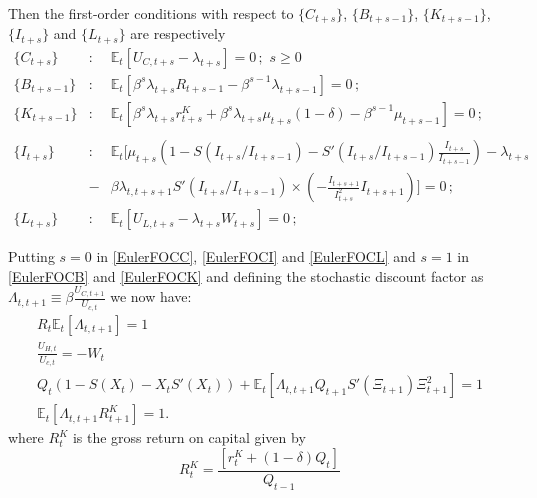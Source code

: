 \documentclass[thmsa,11pt,a4paper]{article}
\theoremstyle{definition}
\begin{document}
Then the first-order conditions with respect to  $\{C_{t+s}\}$, $\{B_{t+s-1}\}$,  $\{K_{t+s-1}\}$,  $\{I_{t+s}\}$ and $\{L_{t+s}\}$ are respectively
\begin{eqnarray}
\label{EulerFOCC} \{C_{t+s}\}&:&  \mathbb{E}_t[U_{C, t+s} - \lambda_{t+s}] =0\,;\,\, s \ge 0 \\
\label{EulerFOCB}\{B_{t+s-1}\}&:&  \mathbb{E}_t[\beta^s \lambda_{t+s} R_{t+s-1}- \beta^{s-1} \lambda_{t+s-1}]=0 \,;\,\, \\
\{K_{t+s-1}\}&:&\label{EulerFOCK}\mathbb{E}_t[\beta^s \lambda_{t+s} r_{t+s}^K + \beta^{s} \lambda_{t+s} \mu_{t+s}(1-\delta)-
\beta^{s-1}  \mu_{t+s-1}]=0 \,;\, \nonumber\\\\
\label{EulerFOCI}\{I_{t+s}\}&:&\mathbb{E}_{t}\big[\mu_{t+s}\left(1-S\left(I_{t+s}/I_{t+s-1}\right)-S'\left(I_{t+s}/I_{t+s-1}\right)\frac{I_{t+s}}{I_{t+s-1}}\right)
-\lambda_{t+s}
\nonumber \\&-&\beta \lambda_{t,t+s+1}S'\left(I_{t+s}/I_{t+s-1}\right)\times\left(-\frac{I_{t+s+1}}{I_{t+s}^{2}}I_{t+s+1}\right)\big]
=0 \,;\,\, \\
\{L_{t+s}\}&:&\mathbb{E}_t[U_{L, t+s} - \lambda_{t+s} W_{t+s} ]=0\,;\,\, \label{EulerFOCL}
\end{eqnarray}

Putting $s=0$ in   \eqref{EulerFOCC}, \eqref{EulerFOCI} and \eqref{EulerFOCL} and $s=1$ in  \eqref{EulerFOCB} and \eqref{EulerFOCK} and defining the stochastic discount factor as  $\Lambda_{t,t+1} \equiv \beta \frac{U_{C,t+1}}{U_{c,t}}$   we now have:
 \begin{align}
R_t \mathbb{E}_t\left[ \Lambda_{t,t+1} \right] =1 \label{RBCEulerApp}\\
\frac{U_{H,t}}{U_{c,t}}=-W_t\\
\label{IFOCApp}
Q_t (1-S(X_t)-X_t S'(X_t)) +\mathbb{E}_t \left[ \Lambda_{t,t+1} 
Q_{t+1} S'(\Xi_{t+1}) \Xi_{t+1}^2 \right] =1 \\
\mathbb{E}_t\left[ \Lambda_{t,t+1} R_{t+1}^K\right]= 1.  \label{RBCFOCKApp}
 \end{align}
where $R_{t}^K$ is the gross return on capital  given by
\begin{equation} \nonumber
 R_{t}^K= \frac{\left[r_{t}^K +(1-\delta) Q_{t}\right]}{Q_{t-1}}
\end{equation}
\end{document}
